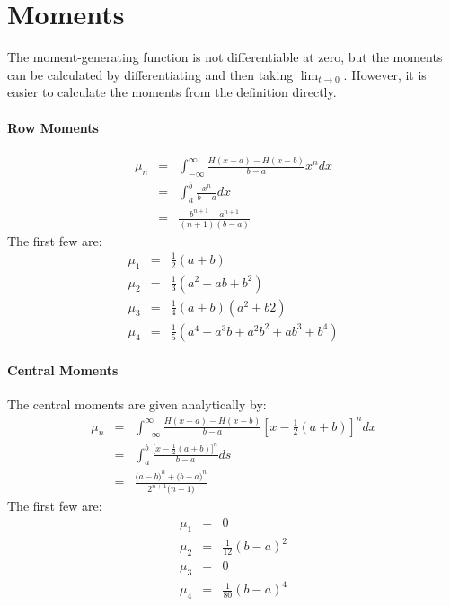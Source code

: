\section{Moments}
The moment-generating function is not differentiable at zero, but the moments
can be calculated by differentiating and then taking $\lim_{t \rightarrow 0}$.
However, it is easier to calculate the moments from the definition directly.

\paragraph{Row Moments}
\begin{eqnarray}
	\nonumber
	\mu_{n} &=& \int_{-\infty}^{\infty}\frac{H(x - a) - H(x - b)}{b - a}x^{n}dx\\
	\nonumber
	&=& \int_{a}^{b}\frac{x^{n}}{b - a}dx\\
	&=& \frac{b^{n + 1} - a^{n +  1}}{(n + 1)(b - a)}
\end{eqnarray}
The first few are:
\begin{eqnarray}
	\mu_{1} &=& \frac{1}{2}(a + b)\\
	\mu_{2} &=& \frac{1}{3}(a^{2} + ab + b^{2})\\
	\mu_{3} &=& \frac{1}{4}(a + b)(a^{2} + b{2})\\
	\mu_{4} &=& \frac{1}{5}(a^{4} + a^{3}b + a^{2}b^{2} + ab^{3} + b^{4})
\end{eqnarray}

\paragraph{Central Moments}
The central moments are given analytically by:
\begin{eqnarray}
	\nonumber
	\mu_{n} &=& \int_{-\infty}^{\infty}\frac{H(x - a) - H(x - b)}{b - a}\left[x - \frac{1}{2}(a + b)\right]^{n}dx\\
	\nonumber
	&=& \int_{a}^{b}\frac{\Big[x - \frac{1}{2}(a + b)\Big]^{n}}{b - a}ds\\
	&=& \frac{\Big(a - b\Big)^{n} + \Big(b - a\Big)^{n}}{2^{n + 1}\Big(n + 1\Big)}
\end{eqnarray}
The first few are:
\begin{eqnarray}
	\mu_{1} &=& 0\\
	\mu_{2} &=& \frac{1}{12}(b - a)^{2}\\
	\mu_{3} &=& 0\\
	\mu_{4} &=& \frac{1}{80}(b - a)^{4}
\end{eqnarray}



